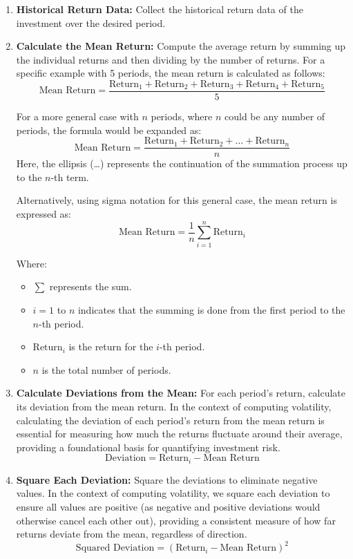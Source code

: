 \documentclass{article}
\begin{document}
\begin{enumerate}
    \item \textbf{Historical Return Data:}
    Collect the historical return data of the investment over the desired period.

    \item \textbf{Calculate the Mean Return:}
        Compute the average return by summing up the individual returns and then dividing by the number of returns. For a specific example with 5 periods, the mean return is calculated as follows:
        \[ \text{Mean Return} = \frac{\text{Return}_1 + \text{Return}_2 + \text{Return}_3 + \text{Return}_4 + \text{Return}_5}{5} \]
    
        For a more general case with \( n \) periods, where \( n \) could be any number of periods, the formula would be expanded as:
        \[ \text{Mean Return} = \frac{\text{Return}_1 + \text{Return}_2 + \ldots + \text{Return}_n}{n} \]
        Here, the ellipsis (\ldots) represents the continuation of the summation process up to the \( n \)-th term.
    
        Alternatively, using sigma notation for this general case, the mean return is expressed as:
        \[ \text{Mean Return} = \frac{1}{n} \sum_{i=1}^{n} \text{Return}_i \]
    
        Where:
        \begin{itemize}
            \item $\sum$ represents the sum.
            \item $i=1$ to $n$ indicates that the summing is done from the first period to the $n$-th period.
            \item $\text{Return}_i$ is the return for the $i$-th period.
            \item $n$ is the total number of periods.
        \end{itemize}


    \item \textbf{Calculate Deviations from the Mean:}
    For each period's return, calculate its deviation from the mean return. In the context of computing volatility, calculating the deviation of each period's return from the mean return is essential for measuring how much the returns fluctuate around their average, providing a foundational basis for quantifying investment risk.
    \[ \text{Deviation} = \text{Return}_i - \text{Mean Return} \]

    \item \textbf{Square Each Deviation:}
    Square the deviations to eliminate negative values. In the context of computing volatility, we square each deviation to ensure all values are positive (as negative and positive deviations would otherwise cancel each other out), providing a consistent measure of how far returns deviate from the mean, regardless of direction.
    \[ \text{Squared Deviation} = (\text{Return}_i - \text{Mean Return})^2 \]


\end{enumerate}
\end{document}
